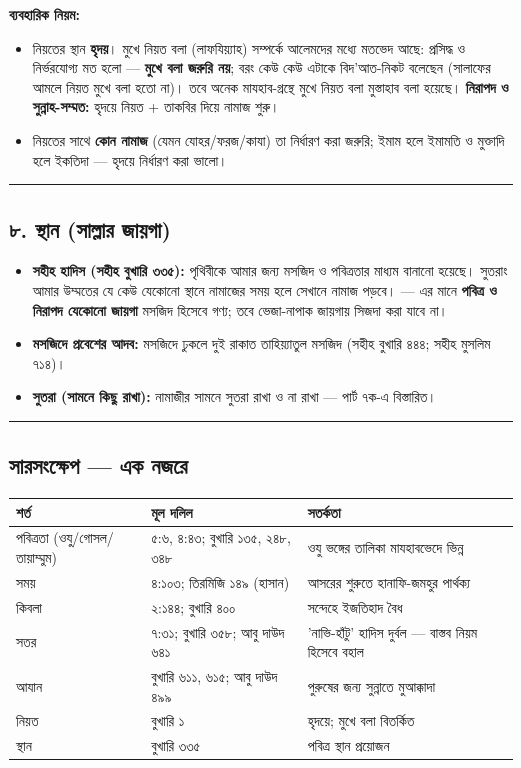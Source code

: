 \textbf{ব্যবহারিক নিয়ম:}
\begin{itemize}
\item নিয়তের স্থান \textbf{হৃদয়}। মুখে নিয়ত বলা (লাফযিয়্যাহ) সম্পর্কে আলেমদের মধ্যে মতভেদ আছে: প্রসিদ্ধ ও নির্ভরযোগ্য মত হলো — \textbf{মুখে বলা জরুরি নয়}; বরং কেউ কেউ এটাকে বিদ'আত-নিকট বলেছেন (সালাফের আমলে নিয়ত মুখে বলা হতো না)। তবে অনেক মাযহাব-গ্রন্থে মুখে নিয়ত বলা মুস্তাহাব বলা হয়েছে। \textbf{নিরাপদ ও সুন্নাহ-সম্মত:} হৃদয়ে নিয়ত + তাকবির দিয়ে নামাজ শুরু।
\item নিয়তের সাথে \textbf{কোন নামাজ} (যেমন যোহর/ফরজ/কাযা) তা নির্ধারণ করা জরুরি; ইমাম হলে ইমামতি ও মুক্তাদি হলে ইকতিদা — হৃদয়ে নির্ধারণ করা ভালো।
\end{itemize}
\medskip\hrule\medskip

\subsection*{৮. স্থান (সাল্লার জায়গা)}

\begin{itemize}
\item \textbf{সহীহ হাদিস (সহীহ বুখারি ৩৩৫):} পৃথিবীকে আমার জন্য মসজিদ ও পবিত্রতার মাধ্যম বানানো হয়েছে। সুতরাং আমার উম্মতের যে কেউ যেকোনো স্থানে নামাজের সময় হলে সেখানে নামাজ পড়বে। — এর মানে \textbf{পবিত্র ও নিরাপদ যেকোনো জায়গা} মসজিদ হিসেবে গণ্য; তবে ভেজা-নাপাক জায়গায় সিজদা করা যাবে না।
\item \textbf{মসজিদে প্রবেশের আদব:} মসজিদে ঢুকলে দুই রাকাত তাহিয়্যাতুল মসজিদ (সহীহ বুখারি ৪৪৪; সহীহ মুসলিম ৭১৪)।
\item \textbf{সুতরা (সামনে কিছু রাখা):} নামাজীর সামনে সুতরা রাখা ও না রাখা — পার্ট ৭ক-এ বিস্তারিত।
\end{itemize}
\medskip\hrule\medskip

\subsection*{সারসংক্ষেপ — এক নজরে}

\begin{table}[h]\centering\small
\begin{tabular}{lll}
শর্ত & মূল দলিল & সতর্কতা \\
\hline
পবিত্রতা (ওযু/গোসল/তায়াম্মুম) & ৫:৬, ৪:৪৩; বুখারি ১৩৫, ২৪৮, ৩৪৮ & ওযু ভঙ্গের তালিকা মাযহাবভেদে ভিন্ন \\
সময় & ৪:১০৩; তিরমিজি ১৪৯ (হাসান) & আসরের শুরুতে হানাফি-জমহুর পার্থক্য \\
কিবলা & ২:১৪৪; বুখারি ৪০০ & সন্দেহে ইজতিহাদ বৈধ \\
সতর & ৭:৩১; বুখারি ৩৫৮; আবু দাউদ ৬৪১ & 'নাভি-হাঁটু' হাদিস দুর্বল — বাস্তব নিয়ম হিসেবে বহাল \\
আযান & বুখারি ৬১১, ৬১৫; আবু দাউদ ৪৯৯ & পুরুষের জন্য সুন্নাতে মুআক্কাদা \\
নিয়ত & বুখারি ১ & হৃদয়ে; মুখে বলা বিতর্কিত \\
স্থান & বুখারি ৩৩৫ & পবিত্র স্থান প্রয়োজন \\
\hline
\end{tabular}
\end{table}

